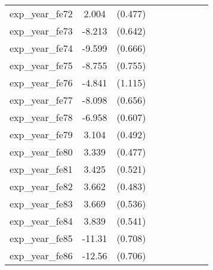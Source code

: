 {\begin{tabular}{l*{4}{cc}}
exp\_year\_fe72&    2.004\sym{***}&  (0.477)&                  &         &                  &         &                  &         \\
exp\_year\_fe73&   -8.213\sym{***}&  (0.642)&                  &         &                  &         &                  &         \\
exp\_year\_fe74&   -9.599\sym{***}&  (0.666)&                  &         &                  &         &                  &         \\
exp\_year\_fe75&   -8.755\sym{***}&  (0.755)&                  &         &                  &         &                  &         \\
exp\_year\_fe76&   -4.841\sym{***}&  (1.115)&                  &         &                  &         &                  &         \\
exp\_year\_fe77&   -8.098\sym{***}&  (0.656)&                  &         &                  &         &                  &         \\
exp\_year\_fe78&   -6.958\sym{***}&  (0.607)&                  &         &                  &         &                  &         \\
exp\_year\_fe79&    3.104\sym{***}&  (0.492)&                  &         &                  &         &                  &         \\
exp\_year\_fe80&    3.339\sym{***}&  (0.477)&                  &         &                  &         &                  &         \\
exp\_year\_fe81&    3.425\sym{***}&  (0.521)&                  &         &                  &         &                  &         \\
exp\_year\_fe82&    3.662\sym{***}&  (0.483)&                  &         &                  &         &                  &         \\
exp\_year\_fe83&    3.669\sym{***}&  (0.536)&                  &         &                  &         &                  &         \\
exp\_year\_fe84&    3.839\sym{***}&  (0.541)&                  &         &                  &         &                  &         \\
exp\_year\_fe85&   -11.31\sym{***}&  (0.708)&                  &         &                  &         &                  &         \\
exp\_year\_fe86&   -12.56\sym{***}&  (0.706)&                  &         &                  &         &                  &         \\

\end{tabular}}
